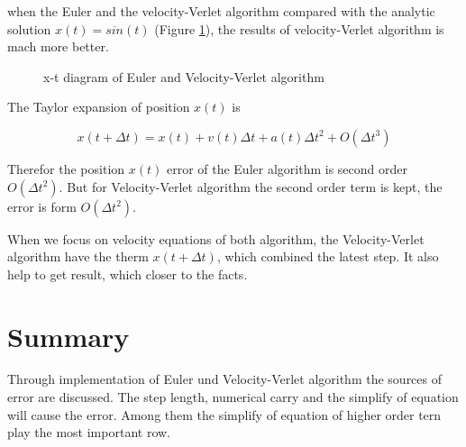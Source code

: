 \documentclass[a4paper,12pt]{article}
\begin{document}
when the Euler and the velocity-Verlet algorithm compared with the analytic solution $x(t) = sin(t)$ (Figure \ref{x_t}), the results of velocity-Verlet algorithm is mach more better.

\begin{figure}[!htbp]
    \centering

    \caption{x-t diagram of Euler and Velocity-Verlet algorithm}
    \label{x_t}
\end{figure}

The Taylor expansion of position $x(t)$ is

\begin{equation}
    x(t+\Delta t) = x(t) + v(t)\Delta t + a(t)\Delta t^2 + O(\Delta t^3)
\end{equation}

Therefor the position $x(t)$ error of the Euler algorithm is second order $O(\Delta t^2)$. But for Velocity-Verlet algorithm the second order term is kept, the error is form $O(\Delta t^2)$.

When we focus on velocity equations of both algorithm, the Velocity-Verlet algorithm have the therm $x(t+\Delta t)$, which combined the latest step. It also help to get result, which closer to the facts.

\section{Summary}

Through implementation of Euler und Velocity-Verlet algorithm the sources of error are discussed. The step length, numerical carry and the simplify of equation will cause the error. Among them the simplify of equation of higher order tern play the most important row.
\end{document}
